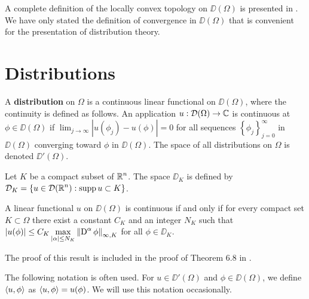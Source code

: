 A complete definition of the locally convex topology on $\DD(\Omega)$
is presented in \cite{RuFA,ReeSim}.  We have only stated the definition of
convergence in $\DD(\Omega)$ that is convenient for the presentation
of distribution theory.

\section{Distributions}

A {\bfseries distribution} on $\Omega$ is a
continuous linear functional on $\DD(\Omega)$, where the continuity is
defined as follows.  An application $u:\mathcal{D}(\Omega) \rightarrow \mathbb{C}$ is
continuous at $\phi \in \DD(\Omega)$ if
$\displaystyle \lim_{j\rightarrow \infty}|u(\phi_j)-u(\phi)| = 0$
for all sequences $\displaystyle \left\{ \phi_j\right\}_{j=0}^\infty$ in
$\DD(\Omega)$ converging toward $\phi$ in $\DD(\Omega)$.
The space of all distributions on $\Omega$ is denoted $\DD'(\Omega)$.

Let $K$ be a compact subset of $\displaystyle \mathbb{R}^n$.  The space
$\DD_K$ is defined by\\
$\displaystyle \mathcal{D}_K = \left\{ u \in \mathcal{D}(\mathbb{R}^n) : \operatorname{supp} u \subset K \right\}$.

\begin{prop} \label{distr_cont_cond}
A linear functional $u$ on $\DD(\Omega)$ is continuous if and only if
for every compact set $K \subset \Omega$ there exist a constant $C_K$
and an integer $N_K$ such that
$\displaystyle \left| u(\phi) \right| \leq C_K \max_{|\alpha|\leq N_K}
\left\| \operatorname{D}^\alpha \phi \right\|_{\infty,K}$
for all $\phi \in \DD_K$.
\end{prop}

The proof of this result is included in the proof of Theorem 6.8 in
\cite{RuFA}.

\begin{rmk}
The following notation is often used.  For $u \in \DD'(\Omega)$ and
$\phi \in \DD(\Omega)$, we define $\left\langle{u} , {\phi}\right\rangle$ as
$\left\langle{u} , {\phi}\right\rangle = u(\phi)$.  We will use this notation occasionally.
\end{rmk}

